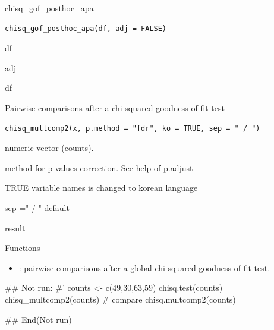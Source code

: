 \documentclass[a4paper]{book}
\begin{document}
%
\begin{Description}
chisq\_gof\_posthoc\_apa
\end{Description}
%
\begin{Usage}
\begin{verbatim}
chisq_gof_posthoc_apa(df, adj = FALSE)
\end{verbatim}
\end{Usage}
%
\begin{Arguments}
\begin{ldescription}
\item[\code{df}] df

\item[\code{adj}] adj
\end{ldescription}
\end{Arguments}
%
\begin{Value}
df
\end{Value}

%
\begin{Description}
Pairwise comparisons after a chi-squared goodness-of-fit test
\end{Description}
%
\begin{Usage}
\begin{verbatim}
chisq_multcomp2(x, p.method = "fdr", ko = TRUE, sep = " / ")
\end{verbatim}
\end{Usage}
%
\begin{Arguments}
\begin{ldescription}
\item[\code{x}] numeric vector (counts).

\item[\code{p.method}] method for p-values correction. See help of p.adjust

\item[\code{ko}] TRUE variable names is changed to korean language

\item[\code{sep}] sep =" / " default
\end{ldescription}
\end{Arguments}
%
\begin{Value}
result
\end{Value}
%
\begin{Section}{Functions}
\begin{itemize}

\item{} : pairwise comparisons after a global chi-squared goodness-of-fit test.


\end{itemize}
\end{Section}
%
\begin{Examples}
\begin{ExampleCode}
\#\# Not run: 
#'
counts <- c(49,30,63,59)
chisq.test(counts)
chisq_multcomp2(counts)
# compare
chisq.multcomp2(counts)


## End(Not run)
\end{ExampleCode}
\end{Examples}
\end{document}
